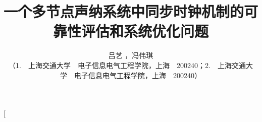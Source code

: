 \documentclass[10.5pt,twocolumn]{jbuaa}
\begin{document}
\title{
\vspace{1cm} \erhao\hei 一个多节点声纳系统中同步时钟机制的可靠性评估和系统优化问题\vspace{-0.2cm}
}

\author{
\sihao\fang 吕艺 ，冯伟琪 \\[0.1cm]
\liuhao （1.~~上海交通大学~~电子信息电气工程学院，上海~~200240；2.~~上海交通大学~~电子信息电气工程学院，上海~~200240）
}

\date{}  %
\twocolumn[
\end{document}

